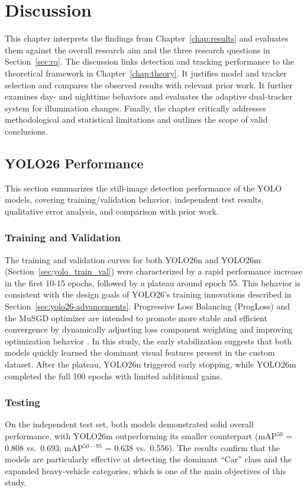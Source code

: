 \chapter{Discussion}
\label{chap:discussion}

This chapter interprets the findings from Chapter~\ref{chap:results} and evaluates them against the overall research aim and the three research questions in Section~\ref{sec:rq}. The discussion links detection and tracking performance to the theoretical framework in Chapter~\ref{chap:theory}. It justifies model and tracker selection and compares the observed results with relevant prior work. It further examines day- and nighttime behaviors and evaluates the adaptive dual-tracker system for illumination changes. Finally, the chapter critically addresses methodological and statistical limitations and outlines the scope of valid conclusions.

\section{YOLO26 Performance}
This section summarizes the still-image detection performance of the YOLO models, covering training/validation behavior, independent test results, qualitative error analysis, and comparison with prior work.
\subsection{Training and Validation}
The training and validation curves for both YOLO26n and YOLO26m (Section~\ref{sec:yolo_train_val}) were characterized by a rapid performance increase in the first 10-15 epochs, followed by a plateau around epoch 55. This behavior is consistent with the design goals of YOLO26’s training innovations described in Section~\ref{sec:yolo26-advancements}. Progressive Loss Balancing (ProgLoss) and the MuSGD optimizer are intended to promote more stable and efficient convergence by dynamically adjusting loss component weighting and improving optimization behavior \citep{sapkota2026yolo26keyarchitecturalenhancements}. In this study, the early stabilization suggests that both models quickly learned the dominant visual features present in the custom dataset. After the plateau, YOLO26n triggered early stopping, while YOLO26m completed the full 100 epochs with limited additional gains.

\subsection{Testing}
On the independent test set, both models demonstrated solid overall performance, with YOLO26m outperforming its smaller counterpart (mAP$^{50}$ = 0.808 vs.\ 0.693; mAP$^{50-95}$ = 0.638 vs.\ 0.556). The results confirm that the models are particularly effective at detecting the dominant ``Car'' class and the expanded heavy-vehicle categories, which is one of the main objectives of this study. 

